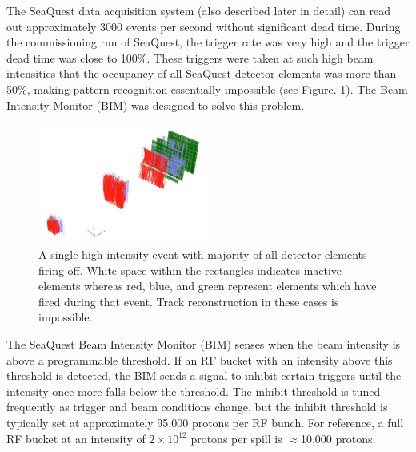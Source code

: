 The SeaQuest data acquisition system (also described later in detail) can read out approximately 3000 events per
second without significant dead time.  During the commissioning run of SeaQuest, the trigger rate was very high and the
trigger dead time was close to 100\%.  These triggers were taken at such high beam intensities that the occupancy
of all SeaQuest detector elements was more than 50$\%$, making pattern recognition essentially impossible
(see Figure. \ref{fig:splat}). The Beam Intensity Monitor (BIM) was designed to solve this problem.

\begin{figure}
	\begin{center}
		\includegraphics[width=0.5\textwidth]{figures/splat2.png}
		\caption{A single high-intensity event with majority of all detector elements firing off. White space within the rectangles indicates inactive elements whereas red, blue, and green represent elements which have fired during that event. Track reconstruction in these cases is impossible.}
		\label{fig:splat}
	\end{center}
\end{figure}

The SeaQuest Beam Intensity Monitor (BIM) senses when the beam intensity is above a programmable threshold.
If an RF bucket with an intensity above this threshold is detected, the BIM sends a signal to inhibit
certain triggers until the intensity once more falls below the threshold. The inhibit threshold is tuned
frequently as trigger and beam conditions change, but the inhibit threshold is typically set at approximately
95,000 protons per RF bunch. For reference, a full RF bucket at an intensity of $2\times 10^{12}$ protons per
spill is $\approx$10,000 protons.

